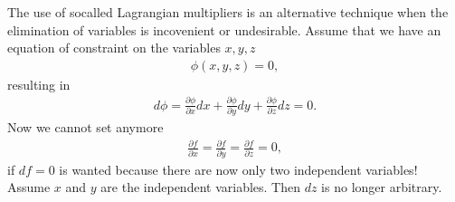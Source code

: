 \documentclass[letterpaper,10pt,english]{sphinxmanual}
\begin{document}
The use of so\sphinxhyphen{}called Lagrangian  multipliers is an alternative technique  when the elimination
of variables is incovenient or undesirable.  Assume that we have an equation of constraint on
the variables \(x,y,z\)
\begin{equation*}
\begin{split}
\phi(x,y,z) = 0,
\end{split}
\end{equation*}
resulting in
\begin{equation*}
\begin{split}
d\phi = \frac{\partial \phi}{\partial x}dx+\frac{\partial \phi}{\partial y}dy+\frac{\partial \phi}{\partial z}dz =0.
\end{split}
\end{equation*}
Now we cannot set anymore
\begin{equation*}
\begin{split}
\frac{\partial f}{\partial x} =\frac{\partial f}{\partial y}=\frac{\partial f}{\partial z}=0,
\end{split}
\end{equation*}
if \(df=0\) is wanted
because there are now only two independent variables!  Assume \(x\) and \(y\) are the independent
variables.
Then \(dz\) is no longer arbitrary.
\end{document}
